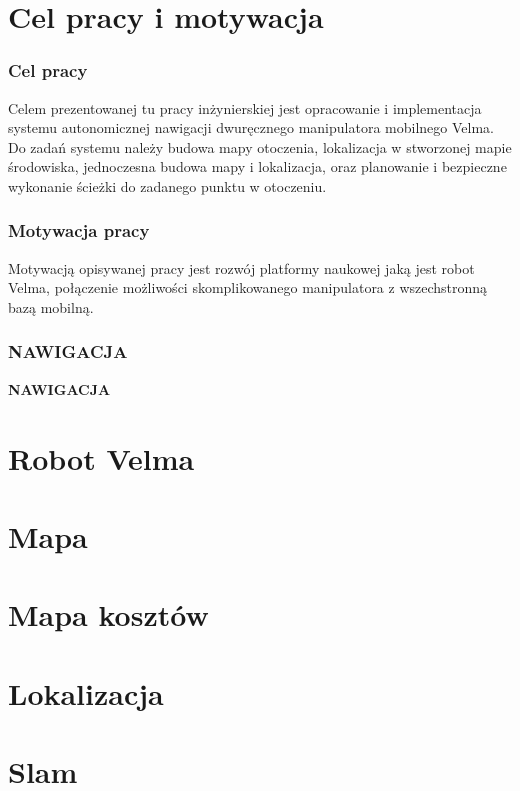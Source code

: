 \documentclass[aspectratio=169,11pt]{beamer}
\begin{document}
\section{Cel pracy i motywacja}
\begin{frame}
\frametitle{Cel pracy}
	Celem prezentowanej tu pracy inżynierskiej jest opracowanie i implementacja systemu autonomicznej nawigacji dwuręcznego manipulatora mobilnego Velma.
	Do zadań systemu należy budowa mapy otoczenia, lokalizacja w stworzonej mapie środowiska, jednoczesna budowa mapy i lokalizacja, oraz planowanie i bezpieczne wykonanie ścieżki do zadanego punktu w otoczeniu.
	
\end{frame}



\begin{frame}
\frametitle{Motywacja pracy}
Motywacją opisywanej pracy jest rozwój platformy naukowej jaką jest robot Velma, połączenie możliwości skomplikowanego manipulatora z wszechstronną bazą mobilną.
\end{frame}

{
\begin{frame}
\frametitle{NAWIGACJA}
	\begin{center}
		\LARGE{\textbf{NAWIGACJA}}
	\end{center}
\end{frame}
}

\section{Robot Velma}


\section{Mapa}


\section{Mapa kosztów}


\section{Lokalizacja}


\section{Slam}

\end{document}
